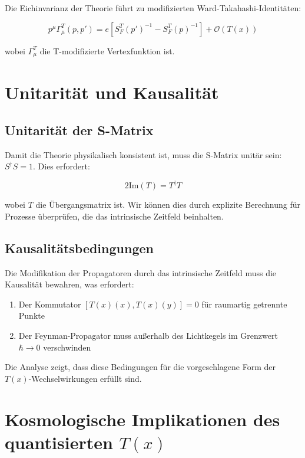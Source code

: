 \documentclass[12pt,a4paper]{article}
\newcommand{\Tfield}{T(x)}
\begin{document}
	Die Eichinvarianz der Theorie führt zu modifizierten Ward-Takahashi-Identitäten:
	
	\begin{equation}
		p^{\mu}\Gamma_{\mu}^T(p,p') = e[S_F^T(p')^{-1} - S_F^T(p)^{-1}] + \mathcal{O}(\Tfield)
	\end{equation}
	
	wobei $\Gamma_{\mu}^T$ die T-modifizierte Vertexfunktion ist.
	
	\section{Unitarität und Kausalität}
	\label{sec:unitaritaet_kausalitaet}
	
	\subsection{Unitarität der S-Matrix}
	\label{sec:unitaritaet}
	
	Damit die Theorie physikalisch konsistent ist, muss die S-Matrix unitär sein: $S^{\dagger}S = 1$. Dies erfordert:
	
	\begin{equation}
		2\mathrm{Im}(T) = T^{\dagger}T
	\end{equation}
	
	wobei $T$ die Übergangsmatrix ist. Wir können dies durch explizite Berechnung für Prozesse überprüfen, die das intrinsische Zeitfeld beinhalten.
	
	\subsection{Kausalitätsbedingungen}
	\label{sec:kausalitaet}
	
	Die Modifikation der Propagatoren durch das intrinsische Zeitfeld muss die Kausalität bewahren, was erfordert:
	
	\begin{enumerate}
		\item Der Kommutator $[\Tfield(x), \Tfield(y)] = 0$ für raumartig getrennte Punkte
		\item Der Feynman-Propagator muss außerhalb des Lichtkegels im Grenzwert $\hbar \to 0$ verschwinden
	\end{enumerate}
	
	Die Analyse zeigt, dass diese Bedingungen für die vorgeschlagene Form der $\Tfield$-Wechselwirkungen erfüllt sind.
	
	\section{Kosmologische Implikationen des quantisierten $\Tfield$}
	\label{sec:kosmologische_implikationen}
	
\end{document}
